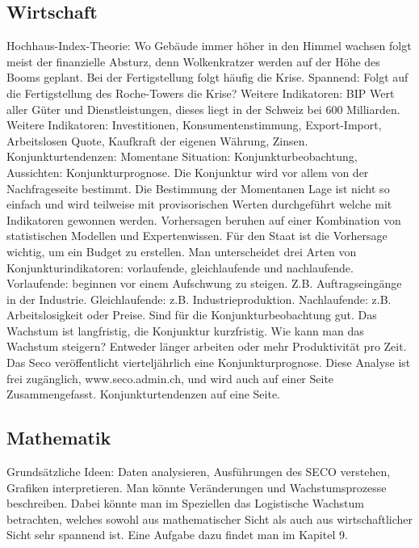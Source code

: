 \documentclass[11pt, twocolumn, a4paper]{scrartcl}
\begin{document}
\subsection{Wirtschaft}
Hochhaus-Index-Theorie: Wo Gebäude immer höher in den Himmel wachsen folgt meist der finanzielle Absturz, denn Wolkenkratzer werden auf der Höhe des Booms geplant. Bei der Fertigstellung folgt häufig die Krise. Spannend: Folgt auf die Fertigstellung des Roche-Towers die Krise? Weitere Indikatoren: BIP Wert aller Güter und Dienstleistungen, dieses liegt in der Schweiz bei 600 Milliarden. Weitere Indikatoren: Investitionen, Konsumentenstimmung, Export-Import, Arbeitslosen Quote, Kaufkraft der eigenen Währung, Zinsen.
Konjunkturtendenzen: Momentane Situation: Konjunkturbeobachtung, Aussichten: Konjunkturprognose. Die Konjunktur wird vor allem von der Nachfrageseite bestimmt. Die Bestimmung der Momentanen Lage ist nicht so einfach und wird teilweise mit provisorischen Werten durchgeführt welche mit Indikatoren gewonnen werden. Vorhersagen beruhen auf einer Kombination von statistischen Modellen und Expertenwissen. Für den Staat ist die Vorhersage wichtig, um ein Budget zu erstellen. Man unterscheidet drei Arten von Konjunkturindikatoren: vorlaufende, gleichlaufende und nachlaufende. Vorlaufende: beginnen vor einem Aufschwung zu steigen. Z.B. Auftragseingänge in der Industrie. Gleichlaufende: z.B. Industrieproduktion. Nachlaufende: z.B. Arbeitslosigkeit oder Preise. Sind für die Konjunkturbeobachtung gut.
Das Wachstum ist langfristig, die Konjunktur kurzfristig. Wie kann man das Wachstum steigern? Entweder länger arbeiten oder mehr Produktivität pro Zeit.
Das Seco veröffentlicht vierteljährlich eine Konjunkturprognose. Diese Analyse ist frei zugänglich, www.seco.admin.ch, und wird auch auf einer Seite Zusammengefasst. \flqq Konjunkturtendenzen auf eine Seite.\frqq 


\subsection{Mathematik}
Grundsätzliche Ideen: Daten analysieren, Ausführungen des SECO verstehen, Grafiken interpretieren.
Man könnte Veränderungen und Wachstumsprozesse beschreiben. Dabei könnte man im Speziellen das Logistische Wachstum betrachten, welches sowohl aus mathematischer Sicht als auch aus wirtschaftlicher Sicht sehr spannend ist. Eine Aufgabe dazu findet man im Kapitel 9.
\end{document}
